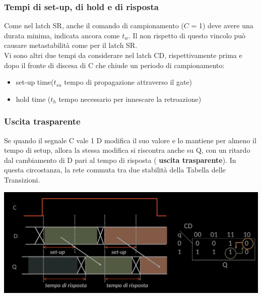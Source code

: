 \documentclass{article}
\begin{document}
\subsubsection{Tempi di set-up, di hold e di risposta}
Come nel latch SR, anche il comando di campionamento ($C$ = 1) deve avere una durata minima, indicata ancora come $t_w$. Il non rispetto di questo vincolo può causare metastabilità come per il latch SR.\\
Vi sono altri due tempi da considerare nel latch CD, rispettivamente prima e dopo il fronte di discesa di C che chiude un periodo di campionamento:
\begin{itemize}
    \item set-up time($t_{su}$ tempo di propagazione attraverso il gate)
    \item hold time ($t_h$ tempo necessario per innescare la retroazione)
\end{itemize}



\subsubsection{Uscita trasparente}
Se quando il segnale C vale 1 D modifica il suo valore e lo mantiene per almeno il tempo di setup, allora la stessa modifica si riscontra anche su Q, con un ritardo dal cambiamento di D pari al tempo di risposta (\textbf{\color{cyan} uscita trasparente}). In questa circostanza, la rete commuta tra due stabilità della Tabella delle Transizioni.
\begin{center}
    \includegraphics[scale=0.35]{uscita trasparente.png}
\end{center}
\end{document}
